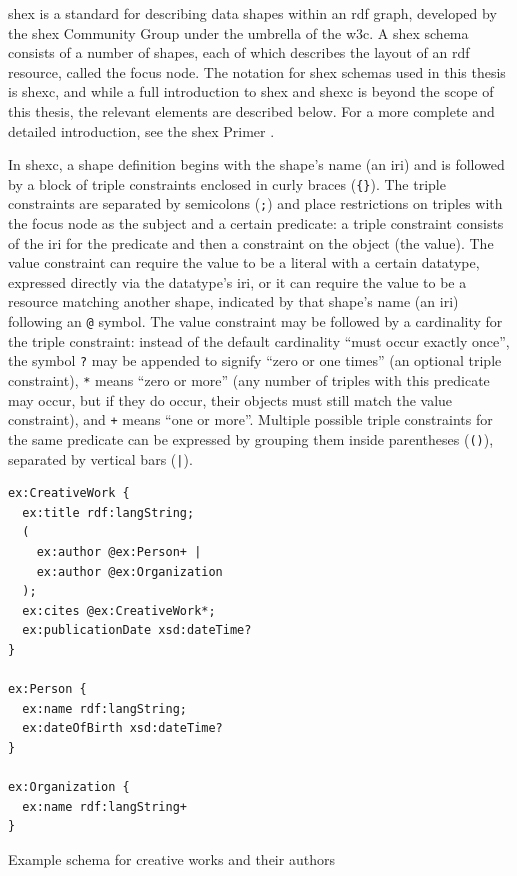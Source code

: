\acrfull{shex} \cite{shex}
is a standard for describing data shapes within an \gls{rdf} graph,
developed by the \gls{shex} Community Group under the umbrella of the \gls{w3c}.
A \gls{shex} \gls{schema} consists of a number of \glspl{shape},
each of which describes the layout of an \gls{rdf} \gls{resource},
called the \gls{focus node}.
The notation for \gls{shex} \glspl{schema} used in this thesis is \gls{shexc},
and while a full introduction to \gls{shex} and \gls{shexc} is beyond the scope of this thesis,
the relevant elements are described below.
For a more complete and detailed introduction,
see the \gls{shex} Primer \cite{shex-primer}.

In \gls{shexc}, a \gls{shape} definition begins with the \gls{shape}’s name (an \gls{iri})
and is followed by a block of \glspl{triple constraint} enclosed in curly braces (\lstinline!{}!).
The \glspl{triple constraint} are separated by semicolons (\lstinline{;})
and place restrictions on \glspl{triple} with the \gls{focus node} as the \gls{subject} and a certain \gls{predicate}:
a \gls{triple constraint} consists of the \gls{iri} for the \gls{predicate} and then a constraint on the \gls{object} (the value).
The value constraint can require the value to be a literal with a certain datatype,
expressed directly via the datatype’s \gls{iri},
or it can require the value to be a \gls{resource} matching another \gls{shape},
indicated by that \gls{shape}’s name (an \gls{iri}) following an \lstinline{@} symbol.
The value constraint may be followed by a cardinality for the \gls{triple constraint}:
instead of the default cardinality “must occur exactly once”,
the symbol \lstinline{?} may be appended to signify “zero or one times”
(an optional \gls{triple constraint}),
\lstinline{*} means “zero or more”
(any number of \glspl{triple} with this \gls{predicate} may occur,
but if they do occur, their \glspl{object} must still match the \gls{value constraint}),
and \lstinline{+} means “one or more”.
Multiple possible \glspl{triple constraint} for the same \gls{predicate} can be expressed
by grouping them inside parentheses (\lstinline{()}), separated by vertical bars (\lstinline{|}).

\begin{listing}
\begin{lstlisting}[language=sparql]
ex:CreativeWork {
  ex:title rdf:langString;
  (
    ex:author @ex:Person+ |
    ex:author @ex:Organization
  );
  ex:cites @ex:CreativeWork*;
  ex:publicationDate xsd:dateTime?
}

ex:Person {
  ex:name rdf:langString;
  ex:dateOfBirth xsd:dateTime?
}

ex:Organization {
  ex:name rdf:langString+
}
\end{lstlisting}
\caption{Example \gls{schema} for creative works and their authors}
\label{listing:shex-example}
\end{listing}

